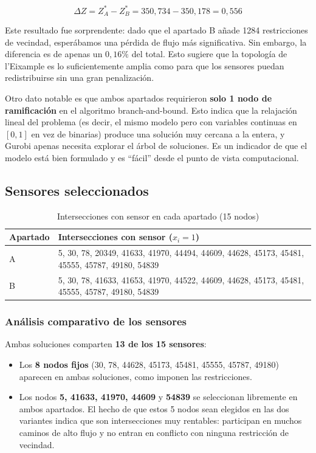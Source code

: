 \documentclass[12pt,a4paper]{article}
\begin{document}
\[
\Delta Z = Z^*_A - Z^*_B = 350{,}734 - 350{,}178 = 0{,}556
\]

Este resultado fue sorprendente: dado que el apartado B añade 1284 restricciones de vecindad, esperábamos una pérdida de flujo más significativa. Sin embargo, la diferencia es de apenas un $0{,}16\%$ del total. Esto sugiere que la topología de l'Eixample es lo suficientemente amplia como para que los sensores puedan redistribuirse sin una gran penalización.

Otro dato notable es que ambos apartados requirieron \textbf{solo 1 nodo de ramificación} en el algoritmo branch-and-bound. Esto indica que la relajación lineal del problema (es decir, el mismo modelo pero con variables continuas en $[0,1]$ en vez de binarias) produce una solución muy cercana a la entera, y Gurobi apenas necesita explorar el árbol de soluciones. Es un indicador de que el modelo está bien formulado y es ``fácil'' desde el punto de vista computacional.

\subsection{Sensores seleccionados}

\begin{table}[H]
\centering
\caption{Intersecciones con sensor en cada apartado (15 nodos)}
\begin{tabular}{>{\raggedright\arraybackslash}p{2.5cm} p{10cm}}
\toprule
\textbf{Apartado} & \textbf{Intersecciones con sensor ($x_i = 1$)} \\
\midrule
A & 5, 30, 78, 20349, 41633, 41970, 44494, 44609, 44628, 45173, 45481, 45555, 45787, 49180, 54839 \\[4pt]
B & 5, 30, 78, 41633, 41653, 41970, 44522, 44609, 44628, 45173, 45481, 45555, 45787, 49180, 54839 \\
\bottomrule
\end{tabular}
\end{table}

\subsubsection{Análisis comparativo de los sensores}

Ambas soluciones comparten \textbf{13 de los 15 sensores}:

\begin{itemize}[itemsep=4pt]
    \item Los \textbf{8 nodos fijos} (30, 78, 44628, 45173, 45481, 45555, 45787, 49180) aparecen en ambas soluciones, como imponen las restricciones.
    \item Los nodos \textbf{5, 41633, 41970, 44609} y \textbf{54839} se seleccionan libremente en ambos apartados. El hecho de que estos 5 nodos sean elegidos en las dos variantes indica que son intersecciones muy rentables: participan en muchos caminos de alto flujo y no entran en conflicto con ninguna restricción de vecindad.
\end{itemize}
\end{document}
